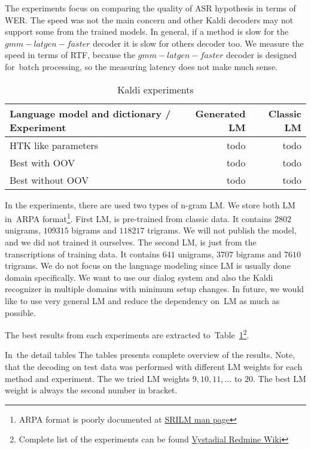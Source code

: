 The experiments focus on comparing the quality of ASR hypothesis in terms of \ac{WER}.
The speed was not the main concern and other Kaldi decoders may not support some from the trained models.
In general, if a method is slow for the $gmm-latgen-faster$ decoder it is slow for others decoder too.
We measure the speed in terms of \ac{RTF}, because the $gmm-latgen-faster$ decoder is designed for~batch 
processing, so the measuring latency does not make much sense.

\begin{table}[!htp]\label{tab:exp_type}
\begin{tabular}{lrr}
\hline
Language model and dictionary / Experiment & Generated \ac{LM}  & Classic \ac{LM} \\
\hline
\ac{HTK} like parameters    & todo & todo \\
Best with OOV               & todo & todo \\
Best without OOV            & todo & todo \\
\hline
\end{tabular}
\caption{Kaldi experiments}
\end{table}

In the experiments, there are used two types of n-gram \acl{LM}. 
We store both \ac{LM} in~ARPA format\footnote{ARPA format is poorly documented at 
\href{http://www.speech.sri.com/projects/srilm/manpages/ngram-format.5.html}{SRILM man page}}.
First \ac{LM}, is pre-trained from classic data. It contains $2802$ unigrams, $109315$ bigrams and
$118217$ trigrams. We will not publish the model, and we did not trained it ourselves. 
The second \ac{LM}, is just from the transcriptions of training data. It contains 
$641$ unigrams, $3707$ bigrams and $7610$ trigrams.
We do not focus on the language modeling since \ac{LM} is usually done domain specifically.
We want to use our dialog system and also the Kaldi recognizer in multiple domains with minimum
setup changes. In future, we would like to use very general \ac{LM} and reduce the dependency on~\ac{LM}
as much as possible.


The best results from each experiments are extracted to~Table~\ref{tab:exp_type}\footnote{ Complete list of the experiments can be found \href{https://redmine.ms.mff.cuni.cz/projects/vystadial/wiki/Acoustic_models/}{Vystadial Redmine Wiki}}. 

In~the detail tables 
The tables  presents complete overview of the results. 
Note, that the decoding on test data was performed with different \ac{LM} weights for each method and 
experiment. The we tried \ac{LM} weights $9, 10, 11, ...$ to $20$. 
The best \ac{LM} weight is always the second number in bracket.

